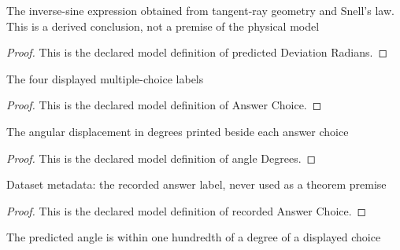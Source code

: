 \begin{definition}
  \label{def:physics:phyx-mini-0101:phyxminiproblems-problemphyxmini0101-predicteddeviationradians}
  The inverse-sine expression obtained from tangent-ray geometry and Snell's law. This is a derived conclusion, not a premise of the physical model
\end{definition}
\begin{proof}
  This is the declared model definition of predicted Deviation Radians.
\end{proof}
\begin{definition}
  \label{def:physics:phyx-mini-0101:phyxminiproblems-problemphyxmini0101-answerchoice}
  The four displayed multiple-choice labels
\end{definition}
\begin{proof}
  This is the declared model definition of Answer Choice.
\end{proof}
\begin{definition}
  \label{def:physics:phyx-mini-0101:phyxminiproblems-problemphyxmini0101-answerchoice-angledegrees}
  The angular displacement in degrees printed beside each answer choice
\end{definition}
\begin{proof}
  This is the declared model definition of angle Degrees.
\end{proof}
\begin{definition}
  \label{def:physics:phyx-mini-0101:phyxminiproblems-problemphyxmini0101-recordedanswerchoice}
  Dataset metadata: the recorded answer label, never used as a theorem premise
\end{definition}
\begin{proof}
  This is the declared model definition of recorded Answer Choice.
\end{proof}
\begin{definition}
  \label{def:physics:phyx-mini-0101:phyxminiproblems-problemphyxmini0101-matcheswithinhundredthdegree}
  The predicted angle is within one hundredth of a degree of a displayed choice
\end{definition}
